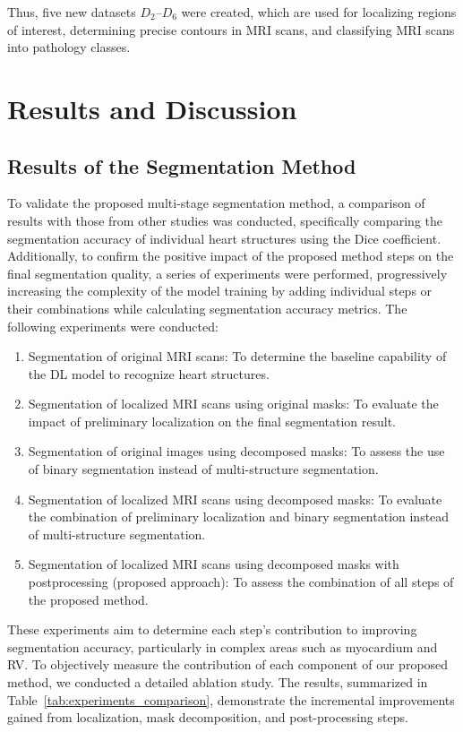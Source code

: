 \documentclass[fleqn,10pt]{wlscirep}
\begin{document}
Thus, five new datasets \({D_2}\)--\({D_6}\) were created, which are used for localizing regions of interest, determining precise contours in MRI scans, and classifying MRI scans into pathology classes.

\section*{Results and Discussion}

\subsection*{Results of the Segmentation Method}

To validate the proposed multi-stage segmentation method, a comparison of results with those from other studies was conducted, specifically comparing the segmentation accuracy of individual heart structures using the Dice coefficient. Additionally, to confirm the positive impact of the proposed method steps on the final segmentation quality, a series of experiments were performed, progressively increasing the complexity of the model training by adding individual steps or their combinations while calculating segmentation accuracy metrics. The following experiments were conducted:

\begin{enumerate}
    \item Segmentation of original MRI scans: To determine the baseline capability of the DL model to recognize heart structures.
    \item Segmentation of localized MRI scans using original masks: To evaluate the impact of preliminary localization on the final segmentation result.
    \item Segmentation of original images using decomposed masks: To assess the use of binary segmentation instead of multi-structure segmentation.
    \item Segmentation of localized MRI scans using decomposed masks: To evaluate the combination of preliminary localization and binary segmentation instead of multi-structure segmentation.
    \item Segmentation of localized MRI scans using decomposed masks with postprocessing (proposed approach): To assess the combination of all steps of the proposed method.
\end{enumerate}

These experiments aim to determine each step's contribution to improving segmentation accuracy, particularly in complex areas such as myocardium and RV.
To objectively measure the contribution of each component of our proposed method, we conducted a detailed ablation study. The results, summarized in Table~\ref{tab:experiments_comparison}, demonstrate the incremental improvements gained from localization, mask decomposition, and post-processing steps.
\end{document}

